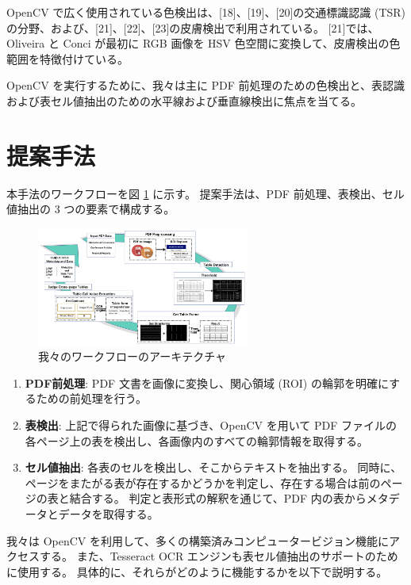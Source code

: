 \documentclass[uplatex, twocolumn,10pt]{jsarticle}
\begin{document}
OpenCV で広く使用されている色検出は、[18]、[19]、[20]の交通標識認識 (TSR) の分野、および、[21]、[22]、[23]の皮膚検出で利用されている。
[21]では、Oliveira と Conci が最初に RGB 画像を HSV 色空間に変換して、皮膚検出の色範囲を特徴付けている。

OpenCV を実行するために、我々は主に PDF 前処理のための色検出と、表認識および表セル値抽出のための水平線および垂直線検出に焦点を当てる。


\section{提案手法}
本手法のワークフローを図 \ref{fig1} に示す。
提案手法は、PDF 前処理、表検出、セル値抽出の 3 つの要素で構成する。

\begin{figure}[tp]
    \begin{center}
        \includegraphics*[width=7cm]{image/master/master2/Fig1.png}
        \caption{我々のワークフローのアーキテクチャ}
        \label{fig1}
    \end{center}
\end{figure}

\begin{enumerate}
    \item \textbf{PDF前処理}:
    PDF 文書を画像に変換し、関心領域 (ROI) の輪郭を明確にするための前処理を行う。
    \item \textbf{表検出}:
    上記で得られた画像に基づき、OpenCV を用いて PDF ファイルの各ページ上の表を検出し、各画像内のすべての輪郭情報を取得する。
    \item \textbf{セル値抽出}:
    各表のセルを検出し、そこからテキストを抽出する。
    同時に、ページをまたがる表が存在するかどうかを判定し、存在する場合は前のページの表と結合する。
    判定と表形式の解釈を通じて、PDF 内の表からメタデータとデータを取得する。
\end{enumerate}

我々は OpenCV を利用して、多くの構築済みコンピュータービジョン機能にアクセスする。
また、Tesseract OCR エンジンも表セル値抽出のサポートのために使用する。
具体的に、それらがどのように機能するかを以下で説明する。
\end{document}
